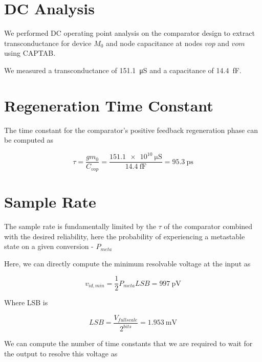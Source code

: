 \documentclass[letterpaper, notitlepage]{revtex4-1}
\begin{document}
\section{DC Analysis}
  We performed DC operating point analysis on the comparator design to extract
  transconductance for device $M_{0}$ and node capacitance at nodes $vop$ and
  $vom$ using CAPTAB.

  We measured a transconductance of \SI{151.1}{\micro\siemens} and a capacitance of \SI{14.4}{\femto\farad}.

\section{Regeneration Time Constant}
  The time constant for the comparator's positive feedback regeneration phase
  can be computed as

  \begin{equation}
    \tau = \frac{gm_0}{C_{vop}} = \frac{\SI{151.1e10}{\micro\siemens}}{\SI{14.4}{\femto\farad}} = \SI{95.3}{\pico\second}
  \end{equation}

\section{Sample Rate}
  The sample rate is fundamentally limited by the $\tau$ of the comparator
  combined with the desired reliability, here the probability of experiencing
  a metastable state on a given conversion - ${P_{meta}}$

  Here, we can directly compute the minimum resolvable voltage at the input as

  \begin{equation}
    v_{id,min} = \frac{1}{2}  P_{meta}  LSB = \SI{997}{\pico\volt}
  \end{equation}

  Where LSB is

  \begin{equation}
    LSB = \frac{V_{fullscale}}{2^{bits}} = \SI{1.953}{\milli\volt}
  \end{equation}

  We can compute the number of time constants that we are required to wait for
  the output to resolve this voltage as
\end{document}
